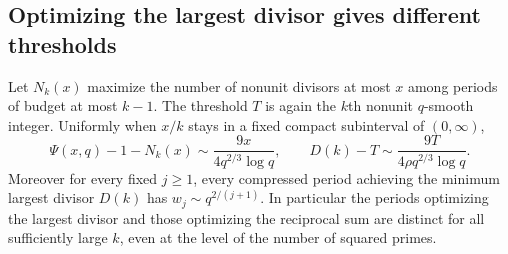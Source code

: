 \subsection*{Optimizing the largest divisor gives different thresholds}
Let $N_k(x)$ maximize the number of nonunit divisors at most $x$ among periods of budget at most $k-1$. The threshold $T$ is again the $k$th nonunit $q$-smooth integer. Uniformly when $x/k$ stays in a fixed compact subinterval of $(0,\infty)$,
\[
 \Psi(x,q)-1-N_k(x)\sim\frac{9x}{4q^{2/3}\log q},
 \qquad
 D(k)-T\sim\frac{9T}{4\rho q^{2/3}\log q}.
\]
Moreover for every fixed $j\ge1$, every compressed period achieving the minimum largest divisor $D(k)$ has $w_j\sim q^{2/(j+1)}$. In particular the periods optimizing the largest divisor and those optimizing the reciprocal sum are distinct for all sufficiently large $k$, even at the level of the number of squared primes.

